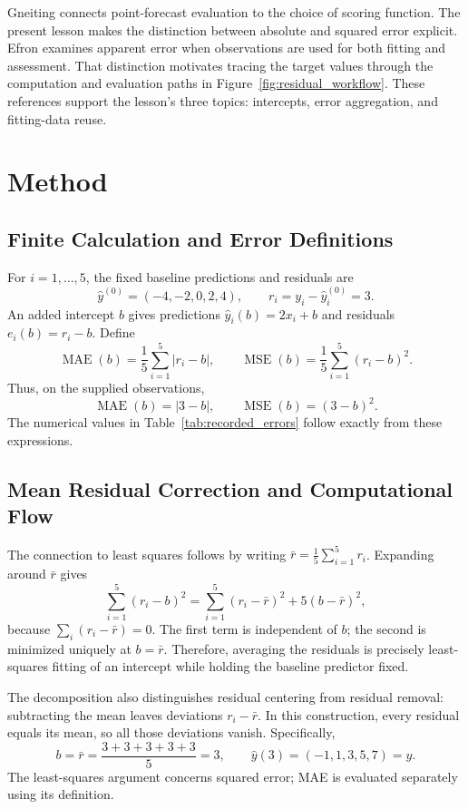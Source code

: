 \documentclass[11pt]{article}
\begin{document}
Gneiting \cite{Gneiting2011MakingEvaluating} connects point-forecast evaluation to the choice of scoring function. The present lesson makes the distinction between absolute and squared error explicit. Efron \cite{Efron1986HowBiased} examines apparent error when observations are used for both fitting and assessment. That distinction motivates tracing the target values through the computation and evaluation paths in Figure~\ref{fig:residual_workflow}. These references support the lesson's three topics: intercepts, error aggregation, and fitting-data reuse.

\section{Method}

\subsection{Finite Calculation and Error Definitions}

For $i=1,\ldots,5$, the fixed baseline predictions and residuals are
\[
\hat{y}^{(0)}=(-4,-2,0,2,4),\qquad
r_i=y_i-\hat{y}^{(0)}_i=3.
\]
An added intercept $b$ gives predictions $\hat{y}_i(b)=2x_i+b$ and residuals $e_i(b)=r_i-b$. Define
\[
\operatorname{MAE}(b)=\frac{1}{5}\sum_{i=1}^{5}|r_i-b|,
\qquad
\operatorname{MSE}(b)=\frac{1}{5}\sum_{i=1}^{5}(r_i-b)^2.
\]
Thus, on the supplied observations,
\[
\operatorname{MAE}(b)=|3-b|,
\qquad
\operatorname{MSE}(b)=(3-b)^2.
\]
The numerical values in Table~\ref{tab:recorded_errors} follow exactly from these expressions.

\subsection{Mean Residual Correction and Computational Flow}

The connection to least squares follows by writing
$\bar r=\frac{1}{5}\sum_{i=1}^{5}r_i$. Expanding around $\bar r$ gives
\[
\sum_{i=1}^{5}(r_i-b)^2
=
\sum_{i=1}^{5}(r_i-\bar r)^2+5(b-\bar r)^2,
\]
because $\sum_i(r_i-\bar r)=0$. The first term is independent of $b$; the second is minimized uniquely at $b=\bar r$. Therefore, averaging the residuals is precisely least-squares fitting of an intercept while holding the baseline predictor fixed.

The decomposition also distinguishes residual centering from residual removal: subtracting the mean leaves deviations $r_i-\bar r$. In this construction, every residual equals its mean, so all those deviations vanish. Specifically,
\[
b=\bar r=\frac{3+3+3+3+3}{5}=3,
\qquad
\hat{y}(3)=(-1,1,3,5,7)=y.
\]
The least-squares argument concerns squared error; MAE is evaluated separately using its definition.
\end{document}
